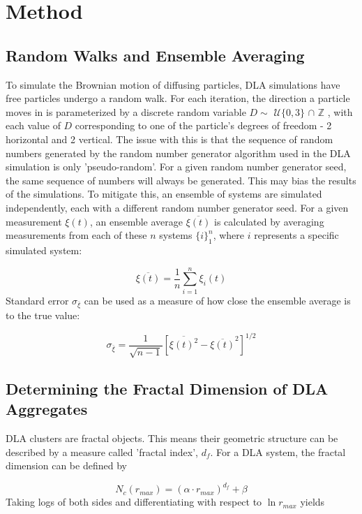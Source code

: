 \documentclass[11pt]{iopart}
\begin{document}
\section{Method}
\subsection{Random Walks and Ensemble Averaging}
To simulate the Brownian motion of diffusing particles, DLA simulations have free particles undergo a random walk. For each iteration, the direction a particle moves in is parameterized by a discrete random variable $D \sim$ $\mathcal{U}\{0, 3\}$ $\cap$ $\mathbb{Z}$ , with each value of $D$ corresponding to one of the particle's degrees of freedom - 2 horizontal and 2 vertical. The issue with this is that the sequence of random numbers generated by the random number generator algorithm used in the DLA simulation is only 'pseudo-random'. For a given random number generator seed, the same sequence of numbers will always be generated. This may bias the results of the simulations. To mitigate this, an ensemble of systems are simulated independently, each with a different random number generator seed. For a given measurement $\xi(t)$, an ensemble average $\overline{\xi(t)}$ is calculated by averaging measurements from each of these $n$ systems $\{i\}_1^n$, where $i$ represents a specific simulated system:


\begin{equation}
\label{averageequation}
\overline{\xi(t)} = \frac{1}{n}\sum_{i=1}^{n}{\xi_i(t)}
\end{equation}
Standard error $\sigma_{\overline{\xi}}$ can be used as a measure of how close the ensemble average is to the true value:

\begin{equation}
\sigma_{\overline{\xi}} = \frac{1}{\sqrt{n-1}} \left[ \overline{\xi(t)^2} - \overline{\xi(t)}^2 \right]^{1/2}
\end{equation}

\subsection{Determining the Fractal Dimension of DLA Aggregates}

DLA clusters are fractal objects. This means their geometric structure can be described by a measure called 'fractal index', $d_f$. For a DLA system, the fractal dimension can be defined by \cite{handout}

\begin{equation}
N_c(r_{max}) = (\alpha \cdot r_{max})^{d_f} + \beta
\end{equation} 
Taking logs of both sides and differentiating with respect to $\ln r_{max}$ yields
\end{document}
